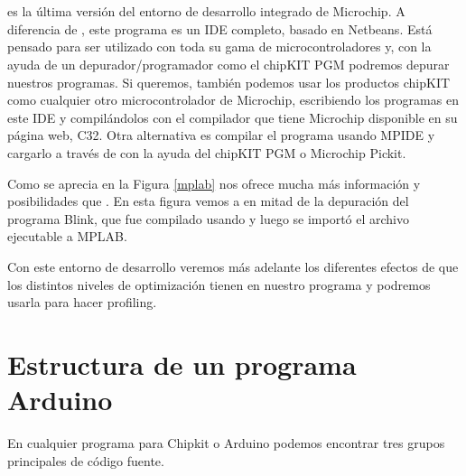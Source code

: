 \section{} 
\cite{website:mplab} es la última versión del entorno de desarrollo integrado de Microchip. A diferencia de
, este programa es un IDE completo, basado en Netbeans.  Está pensado para ser utilizado con toda su gama de microcontroladores y, con la ayuda de un depurador/programador como el chipKIT PGM podremos depurar nuestros programas.  Si queremos, también podemos usar los productos chipKIT como cualquier otro microcontrolador de Microchip, escribiendo los programas en este IDE y compilándolos con el compilador que tiene Microchip disponible en su página web, C32\cite{website:c32}.  Otra alternativa es compilar el programa usando MPIDE y cargarlo a través de  con la ayuda del chipKIT PGM o Microchip Pickit.

Como se aprecia en la Figura \ref{mplab}  nos ofrece mucha más información y posibilidades que .  En esta figura vemos a  en mitad de la depuración del programa Blink, que fue compilado usando  y luego se importó el archivo ejecutable a MPLAB.

Con este entorno de desarrollo veremos más adelante los diferentes efectos de que los distintos niveles de optimización tienen en nuestro programa y podremos usarla para hacer profiling.


\section{Estructura de un programa Arduino}
En cualquier programa para Chipkit o Arduino podemos encontrar tres grupos principales de código fuente.
